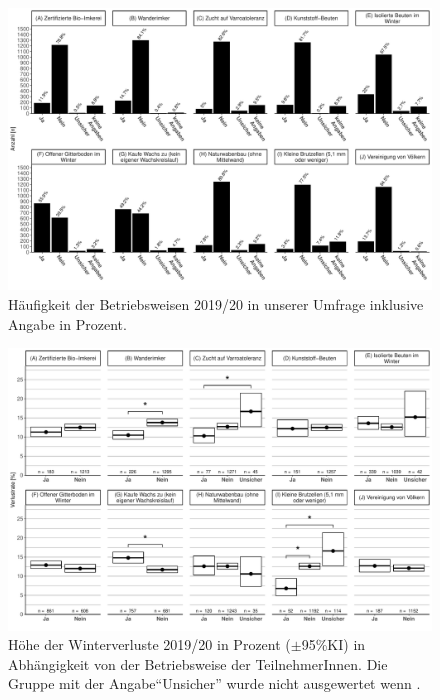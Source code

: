 \begin{figure}[H]
  \centering
  \includegraphics[keepaspectratio,width=1\textwidth]{project-U-wintersterblichkeit/figures/plot_operational_hist}
  \caption{Häufigkeit der Betriebsweisen 2019/20 in unserer Umfrage inklusive Angabe in Prozent.}
  \label{fig:u:operational:hist}
\end{figure}

\begin{figure}[H]
  \centering
  \includegraphics[keepaspectratio,width=1\textwidth]{project-U-wintersterblichkeit/figures/plot_operational_loss}
  \caption{Höhe der Winterverluste 2019/20 in Prozent ($\pm$95\%KI) in Abhängigkeit von der Betriebsweise der TeilnehmerInnen. Die Gruppe mit der Angabe\enquote{Unsicher} wurde nicht ausgewertet wenn .}
  \label{fig:u:operational:loss}
\end{figure}


